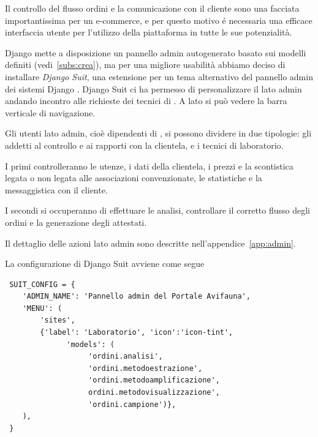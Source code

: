 Il controllo del flusso ordini e la comunicazione con il cliente sono una facciata importantissima per un e-commerce, e per questo motivo é necessaria una efficace interfaccia utente per l'utilizzo della piattaforma in tutte le sue potenzialità.

Django mette a disposizione un pannello admin autogenerato basato sui modelli definiti (vedi~\ref{subs:crea}), ma per una migliore usabilità abbiamo deciso di installare \emph{Django Suit}, una estensione per un tema alternativo del pannello admin dei sistemi Django \cite{suit}. Django Suit ci ha permesso di personalizzare il lato admin andando incontro alle richieste dei tecnici di {\fem}. A lato si può vedere la barra verticale di navigazione.

Gli utenti lato admin, cioè dipendenti di {\fem}, si possono dividere in due tipologie: gli addetti al controllo e ai rapporti con la clientela, e i tecnici di laboratorio.

I primi controlleranno le utenze, i dati della clientela, i prezzi e la scontistica legata o non legata alle associazioni convenzionate, le statistiche e la messaggistica con il cliente.

I secondi si occuperanno di effettuare le analisi, controllare il corretto flusso degli ordini e la generazione degli attestati.

Il dettaglio delle azioni lato admin sono descritte nell'appendice~\ref{app:admin}.

La configurazione di Django Suit avviene come segue
\begin{footnotesize}
\begin{verbatim}
 SUIT_CONFIG = {
    'ADMIN_NAME': 'Pannello admin del Portale Avifauna',
    'MENU': (
        'sites',
        {'label': 'Laboratorio', 'icon':'icon-tint', 
              'models': (
                   'ordini.analisi', 
                   'ordini.metodoestrazione', 
                   'ordini.metodoamplificazione', 
                   ordini.metodovisualizzazione', 
                   'ordini.campione')},
    ),
 }
\end{verbatim}
\end{footnotesize}


